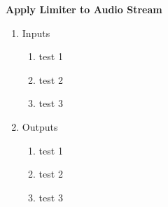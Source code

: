\item \textbf{Apply Limiter to Audio Stream}

\begin{enumerate}
	\item Inputs
	\begin{enumerate}
		\item test 1
		\item test 2
		\item test 3
	\end{enumerate}


	\item Outputs
	\begin{enumerate}
		\item test 1
		\item test 2
		\item test 3
	\end{enumerate}	


\end{enumerate}